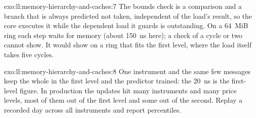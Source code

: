 \begin{solution}{exo:ll:memory-hierarchy-and-caches:7}
The bounds check is a comparison and a branch that is always predicted not taken, independent of the load's result, so
the core executes it while the dependent load it guards is outstanding. On a 64~MiB ring each step waits for memory
(about \qty{150}{\nano\second} here); a check of a cycle or two cannot show. It would show on a ring that fits the first
level, where the load itself takes five cycles.
\end{solution}

\begin{solution}{exo:ll:memory-hierarchy-and-caches:8}
One instrument and the same few messages keep the whole  in the first level and the predictor trained: the
\qty{20}{\nano\second} is the first-level figure. In production the updates hit many instruments and many price levels,
most of them out of the first level and some out of the second. Replay a recorded day across all instruments and
report percentiles.
\end{solution}

